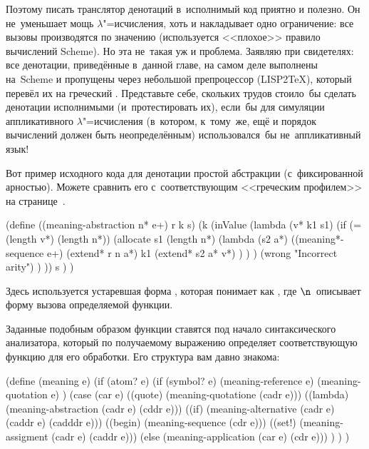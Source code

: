 Поэтому писать транслятор денотаций в~исполнимый код приятно и полезно. Он
не~уменьшает мощь $\lambda$"=исчисления, хоть и накладывает одно ограничение:
все вызовы производятся по значению (используется <<плохое>> правило вычислений
Scheme). Но эта не~такая уж и проблема. Заявляю при свидетелях: все денотации,
приведённые в~данной главе, на самом деле выполнены на~Scheme и пропущены через
небольшой препроцессор (LISP2\TeX), который перевёл их на греческий
\cite{que93d}. %
Представьте себе, скольких трудов стоило~бы сделать денотации
исполнимыми (и~протестировать их), если~бы для симуляции аппликативного
$\lambda$"=исчисления (в~котором, к~тому~же, ещё и порядок вычислений должен
быть неопределённым) использовался~бы не~аппликативный язык!

Вот пример исходного кода для денотации простой абстракции (с~фиксированной
арностью). Можете сравнить его с~соответствующим <<греческим профилем>>
на странице~\pageref{denotational/sematics/fig:naked-scheme}.

\begin{code:lisp}
(define ((meaning-abstraction n* e+) r k s)
  (k (inValue (lambda (v* k1 s1)
                (if (= (length v*) (length n*))
                    (allocate s1 (length n*)
                              (lambda (s2 a*)
                                ((meaning*-sequence e+)
                                 (extend* r n a*)
                                 k1
                                 (extend* s2 a* v*) ) ) )
                    (wrong "Incorrect arity") ) ))
     s ) )
\end{code:lisp}

Здесь используется устаревшая форма , которая понимает  как , где $\n$~описывает форму вызова определяемой функции.

Заданные подобным образом функции ставятся под начало синтаксического
анализатора, который по получаемому выражению определяет соответствующую
функцию для его обработки. Его структура вам давно знакома:

\begin{code:lisp}
(define (meaning e)
  (if (atom? e)
      (if (symbol? e) (meaning-reference e)
                      (meaning-quotation e) )
      (case (car e)
        ((quote)  (meaning-quotatione (cadr e)))
        ((lambda) (meaning-abstraction (cadr e) (cddr e)))
        ((if)     (meaning-alternative (cadr e) (caddr e) (cadddr e)))
        ((begin)  (meaning-sequence (cdr e)))
        ((set!)   (meaning-assigment (cadr e) (caddr e)))
        (else     (meaning-application (car e) (cdr e))) ) ) )
\end{code:lisp}



